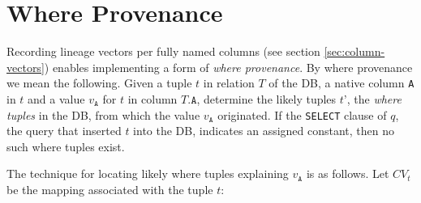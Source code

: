 \section{Where Provenance}
Recording lineage vectors per fully named columns (see section \ref{sec:column-vectors}) enables implementing a form of \textit{where provenance}. By where provenance we mean the following. Given a tuple $t$ in relation $T$ of the DB, a native column \texttt{A} in $t$ and a value $v_\texttt{A}$ for $t$ in column $T.\texttt{A}$, determine the likely tuples $t’$, the \textit{where tuples} in the DB, from which the value $v_\texttt{A}$ originated. If the \texttt{SELECT} clause of $q$, the query that inserted $t$ into the DB, indicates an assigned constant, then no such where tuples exist. 
\par The technique for locating likely where tuples explaining $v_\texttt{A}$ is as follows. Let $CV_t$ be the mapping associated with the tuple $t$:
